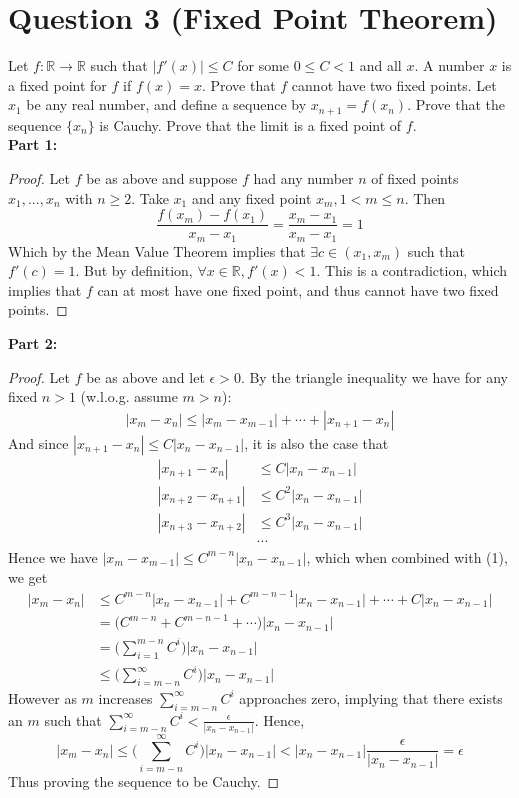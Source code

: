 \documentclass[12pt, letterpaper]{article}
\begin{document}
\section*{Question 3 (Fixed Point Theorem)}
Let $f: \mathbb R \rightarrow \mathbb R$ such that $|f'(x)| \leq C$ for some $0\leq C< 1$ and all $x$.  A number $x$ is a fixed point for $f$ if
$f(x)=x$. Prove that $f$ cannot have two fixed points.
Let $x_1$ be any real number, and define
a sequence by $x_{n+1}=f(x_n)$. Prove that the sequence $\{x_n\}$ is Cauchy. Prove that the limit is a fixed
point of $f$. \\

\textbf{Part 1:}
\begin{proof}
  Let $f$ be as above and suppose $f$ had any number $n$ of fixed points $x_1, ..., x_n$ with $n \geq 2$. Take $x_1$ and any fixed point $x_m, 1 < m \leq n$.
  Then
  $$ \frac{f(x_m) - f(x_1)}{x_m-x_1} = \frac{x_m - x_1}{x_m-x_1} = 1$$
  Which by the Mean Value Theorem implies that $\exists c \in (x_1, x_m)$ such that $f'(c) = 1$. But by definition, $\forall x \in \mathbb R, f'(x) < 1$.
  This is a contradiction, which implies that $f$ can at most have one fixed point, and thus cannot have two fixed points.
\end{proof}
\pagebreak
\textbf{Part 2:}
\begin{proof}
  Let $f$ be as above and let $\epsilon > 0$. By the triangle inequality we have for any fixed $n > 1$ (w.l.o.g. assume $m > n$):
  \begin{align}
  |x_m - x_n| \leq |x_m - x_{m-1}| + \cdots + |x_{n+1} - x_{n}|
  \end{align}
  And since $|x_{n+1} - x_n| \leq C|x_n - x_{n-1}|$, it is also the case that
  \begin{align*}
    |x_{n+1} - x_n| &\leq C|x_n - x_{n-1}|\\
    |x_{n+2} - x_{n+1}| &\leq C^2|x_n - x_{n-1}|\\
    |x_{n+3} - x_{n+2}| &\leq C^3|x_n - x_{n-1}|\\
    &\cdots
  \end{align*}
  Hence we have $|x_m - x_{m-1}| \leq C^{m-n}|x_n - x_{n-1}|$, which when combined with (1), we get
  \begin{align*}
    |x_m - x_n| &\leq C^{m-n}|x_n - x_{n-1}| + C^{m-n-1}|x_n - x_{n-1}| + \cdots + C|x_n - x_{n-1}|\\
    &= \big(C^{m-n} + C^{m-n-1} + \cdots \big)|x_n - x_{n-1}|\\
    &= \Bigg( \sum^{m-n}_{i=1} C^i \Bigg)|x_n - x_{n-1}|\\
    &\leq\Bigg( \sum^{\infty}_{i=m-n} C^i \Bigg)|x_n - x_{n-1}|
  \end{align*}
  However as $m$ increases $\sum^{\infty}_{i=m-n} C^i$ approaches zero, implying that there exists an $m$ such that $\sum^{\infty}_{i=m-n} C^i < \frac{\epsilon}{|x_n - x_{n-1}|}$.
  Hence,
  $$ |x_m - x_n| \leq \Bigg( \sum^{\infty}_{i=m-n} C^i\Bigg) |x_n - x_{n-1}| < |x_n - x_{n-1}|\frac{\epsilon}{|x_n - x_{n-1}|} = \epsilon $$
  Thus proving the sequence to be Cauchy.
\end{proof}
\end{document}
